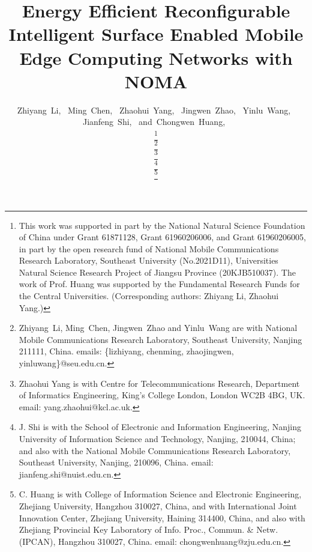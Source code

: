 \documentclass[journal]{IEEEtran}
\begin{document}
%
\title{Energy Efficient Reconfigurable Intelligent Surface Enabled Mobile Edge Computing Networks with NOMA}
%
%
%

\author{
	Zhiyang~Li,~
	Ming~Chen,~
        Zhaohui~Yang,~
        Jingwen~Zhao,~
        Yinlu~Wang,~
        Jianfeng~Shi,~
        and~Chongwen~Huang,~

\thanks{This work was supported in part by the National Natural Science Foundation of China under Grant 61871128, Grant 61960206006, and Grant 61960206005, in part by the open research fund of National Mobile Communications Research Laboratory, Southeast University (No.2021D11), Universities Natural Science Research Project of Jiangsu Province (20KJB510037). The work of Prof. Huang was supported by the Fundamental Research Funds for the Central Universities. (Corresponding authors: Zhiyang Li, Zhaohui Yang.)}

\thanks{Zhiyang~Li, Ming~Chen, Jingwen~Zhao and Yinlu~Wang are with National Mobile Communications Research Laboratory, Southeast University, Nanjing 211111, China. emails: \{lizhiyang, chenming, zhaojingwen,  yinluwang\}@seu.edu.cn.}%

\thanks{Zhaohui Yang is with Centre for
	Telecommunications Research, Department of Informatics Engineering, King’s College London, London WC2B
	4BG, UK. email: yang.zhaohui@kcl.ac.uk.}%

\thanks{J. Shi is with the School of Electronic and Information Engineering, Nanjing University of Information Science and Technology, Nanjing, 210044, China; and also with the National Mobile Communications Research Laboratory, Southeast University, Nanjing, 210096, China. email: jianfeng.shi@nuist.edu.cn.}

\thanks{C. Huang is with College of Information Science and Electronic Engineering, Zhejiang University, Hangzhou 310027, China, and with International Joint Innovation Center, Zhejiang University, Haining 314400, China, and also with Zhejiang Provincial Key Laboratory of Info. Proc., Commun. \& Netw. (IPCAN), Hangzhou 310027, China. email: chongwenhuang@zju.edu.cn.}

}
\end{document}
